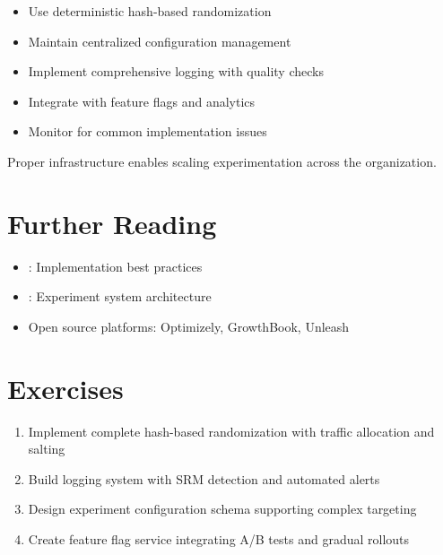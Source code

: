 \begin{itemize}
    \item Use deterministic hash-based randomization
    \item Maintain centralized configuration management
    \item Implement comprehensive logging with quality checks
    \item Integrate with feature flags and analytics
    \item Monitor for common implementation issues
\end{itemize}

Proper infrastructure enables scaling experimentation across the organization.

\section{Further Reading}

\begin{itemize}
    \item \cite{kohavi2020trustworthy}: Implementation best practices
    \item \cite{tang2010overlapping}: Experiment system architecture
    \item Open source platforms: Optimizely, GrowthBook, Unleash
\end{itemize}

\section{Exercises}

\begin{enumerate}
    \item Implement complete hash-based randomization with traffic allocation and salting
    \item Build logging system with SRM detection and automated alerts
    \item Design experiment configuration schema supporting complex targeting
    \item Create feature flag service integrating A/B tests and gradual rollouts
\end{enumerate}
